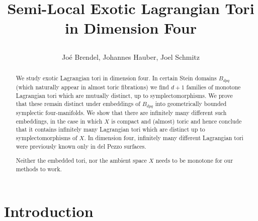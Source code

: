 \documentclass[12pt,a4paper,abstract=true,final]{scrartcl}
\begin{document}
\title{Semi-Local Exotic Lagrangian Tori in Dimension Four\\
\bigskip
{}\vspace{-0.5cm}}
\author{Joé Brendel, Johannes Hauber, Joel Schmitz}

\maketitle

\begin{abstract}
    We study exotic Lagrangian tori in dimension four.
In certain Stein domains $B_{dpq}$ (which naturally appear in almost toric fibrations) we find $d+1$ families of monotone Lagrangian tori which are mutually distinct, up to symplectomorphisms.
We prove that these remain distinct under embeddings of $B_{dpq}$ into geometrically bounded symplectic four-manifolds.
We show that there are infinitely many different such embeddings, in the case in which $X$ is compact and (almost) toric and hence conclude that it contains infinitely many Lagrangian tori which are distinct up to symplectomorphisms of $X$.
In dimension four, infinitely many different Lagrangian tori were previously known
only in del Pezzo surfaces.

    Neither the embedded tori, nor the ambient space $X$ needs to be monotone for our methods to work. 
\end{abstract}

\section{Introduction}
\end{document}
